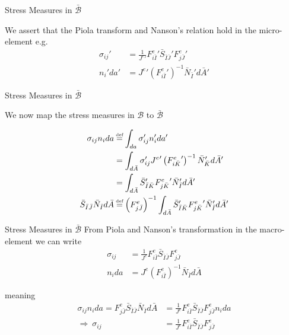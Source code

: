 \documentclass[11pt]{beamer}
\newcommand\defeq{\mathrel{\stackrel{\makebox[0pt]{\mbox{\normalfont\tiny def}}}{=}}}
\begin{document}
\begin{frame}{Stress Measures in $\bar{\mathcal{B}}$}%

We assert that the Piola transform and Nanson's relation hold in the micro-element e.g.
\begin{align*}
\sigma_{ij}' &= \frac{1}{{J^e}'}{F_{i\bar{I}}^e}' \bar{S}_{\bar{I}\bar{J}}' {F_{j\bar{J}}^e}'\\
n_i' da' &= {J^e}' \left({F_{i\bar{I}}^e}'\right)^{-1} \bar{N}_{\bar{I}}' d\bar{A}'
\end{align*}

\end{frame}

\begin{frame}{Stress Measures in $\bar{\mathcal{B}}$}%

We now map the stress measures in $\mathcal{B}$ to $\bar{\mathcal{B}}$

\begin{align*}
\sigma_{ij}n_i da &\defeq \int_{da} \sigma_{ij}'n_i' da'\\
&= \int_{d\bar{A}} \sigma_{ij}' {J^e}' \left({F_{i\bar{K}}^e}'\right)^{-1} \bar{N}_{\bar{K}}' d\bar{A}'\\
&= \int_{d\bar{A}} \bar{S}_{\bar{I}\bar{K}}' {F_{j\bar{K}}^e}' \bar{N}_{\bar{I}}' d\bar{A}'\\
\bar{S}_{\bar{I}\bar{J}} \bar{N}_{\bar{I}} d\bar{A} &\defeq \left(F_{j\bar{J}}^e\right)^{-1} \int_{d\bar{A}} \bar{S}_{\bar{I}\bar{K}}' {F_{j\bar{K}}^e}' \bar{N}_{\bar{I}}' d\bar{A}'\\
\end{align*}

\end{frame}

\begin{frame}{Stress Measures in $\bar{\mathcal{B}}$}%
From Piola and Nanson's transformation in the macro-element we can write
\begin{align*}
\sigma_{ij} &= \frac{1}{{J^e}}{F_{i\bar{I}}^e} \bar{S}_{\bar{I}\bar{J}} {F_{j\bar{J}}^e}\\
n_i da &= {J^e} \left({F_{i\bar{I}}^e}\right)^{-1} \bar{N}_{\bar{I}} d\bar{A}
\end{align*}

meaning
\begin{align*}
\sigma_{ij} n_i da = F_{j\bar{J}}^e\bar{S}_{\bar{I}\bar{J}} \bar{N}_{\bar{I}} d\bar{A} &= \frac{1}{J^e} F_{i\bar{I}}^e \bar{S}_{\bar{I}\bar{J}} F_{j\bar{J}}^e n_i da\\
\Rightarrow\ \sigma_{ij} &= \frac{1}{J^e} F_{i\bar{I}}^e \bar{S}_{\bar{I}\bar{J}} F_{j\bar{J}}^e \\
\end{align*}
\end{frame}
\end{document}
